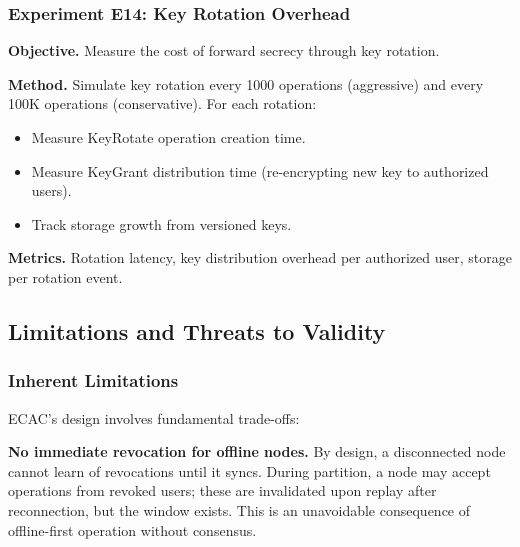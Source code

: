 \subsubsection{Experiment E14: Key Rotation Overhead}
\textbf{Objective.} Measure the cost of forward secrecy through key rotation.

\textbf{Method.} Simulate key rotation every 1000 operations (aggressive) and every 100K operations (conservative). For each rotation:
\begin{itemize}
    \item Measure KeyRotate operation creation time.
    \item Measure KeyGrant distribution time (re-encrypting new key to authorized users).
    \item Track storage growth from versioned keys.
\end{itemize}

\textbf{Metrics.} Rotation latency, key distribution overhead per authorized user, storage per rotation event.



\subsection{Limitations and Threats to Validity}\label{subsec:limitations}

\subsubsection{Inherent Limitations}
ECAC's design involves fundamental trade-offs:

\noindent\textbf{No immediate revocation for offline nodes.} By design, a disconnected node cannot learn of revocations until it syncs. During partition, a node may accept operations from revoked users; these are invalidated upon replay after reconnection, but the window exists. This is an unavoidable consequence of offline-first operation without consensus.

